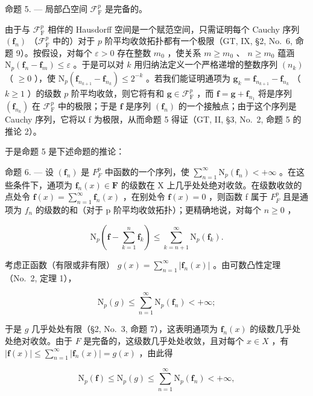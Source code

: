 命题 5. --- 局部凸空间 \(\mathcal{F}_{\mathrm{F}}^{p}\) 是完备的。

由于与 \(\mathcal{F}_{\mathrm{F}}^{p}\) 相伴的 Hausdorff 空间是一个赋范空间，只需证明每个 Cauchy 序列 \((\mathbf{f}_n)\) （\(\mathcal{F}_{\mathrm{F}}^{p}\) 中的）对于 \(p\) 阶平均收敛拓扑都有一个极限（GT, IX, §2, No.~6, 命题 9）。按假设，对每个 \(\varepsilon > 0\) 存在整数 \(m_0\) ，使关系 \(m \geqslant m_0\) 、 \(n \geqslant m_0\) 蕴涵 \(\mathrm{N}_p(\mathbf{f}_n - \mathbf{f}_m) \leqslant \varepsilon\) 。于是可以对 \(k\) 用归纳法定义一个严格递增的整数序列 \((n_k)\) （ \(\geqslant 0\) ），使 \(\mathrm{N}_p(\mathbf{f}_{n_{k+1}} - \mathbf{f}_{n_k}) \leqslant 2^{-k}\) 。若我们能证明通项为 \(\mathbf{g}_k = \mathbf{f}_{n_{k+1}} - \mathbf{f}_{n_k}\) （ \(k \geqslant 1\) ）的级数 \(p\) 阶平均收敛，则它将有和 \(\mathbf{g} \in \mathcal{F}_{\mathrm{F}}^p\) ，而 \(\mathbf{f} = \mathbf{g} + \mathbf{f}_{n_1}\) 将是序列 \((\mathbf{f}_{n_k})\) 在 \(\mathcal{F}_{\mathrm{F}}^p\) 中的极限；于是 \(\mathbf{f}\) 是序列 \((\mathbf{f}_n)\) 的一个接触点；由于这个序列是 Cauchy 序列，它将以 f 为极限，从而命题 5 得证（GT, II, §3, No.~2, 命题 5 的推论 2）。

于是命题 5 是下述命题的推论：

命题 6. --- 设 \((\mathbf{f}_{n})\) 是 \(F_{F}^{p}\) 中函数的一个序列，使 \(\sum_{n=1}^{\infty}\mathrm{N}_{p}(\mathbf{f}_{n})<+\infty\) 。在这些条件下，通项为 \(\mathbf{f}_{n}(x)\in\mathbf{F}\) 的级数在 X 上几乎处处绝对收敛。在级数收敛的点处令 \(\mathbf{f}(x)=\sum_{n=1}^{\infty}\mathbf{f}_{n}(x)\) ，在别处令 \(\mathbf{f}(x)=0\) ，则函数 f 属于 \(F_{F}^{p}\) 且是通项为 \(f_{n}\) 的级数的和（对于 p 阶平均收敛拓扑）；更精确地说，对每个 \(n\geqslant0\) ，

\[
\mathrm{N} _ {p} \left(\mathbf {f} - \sum_ {k = 1} ^ {n} \mathbf {f} _ {k}\right) \leqslant \sum_ {k = n + 1} ^ {\infty} \mathrm{N} _ {p} (\mathbf {f} _ {k}).\tag{8}
\]

考虑正函数（有限或非有限） \(g(x) = \sum_{n=1}^{\infty} |\mathbf{f}_n(x)|\) 。由可数凸性定理（No.~2, 定理 1），

\[
\mathrm{N} _ {p} (g) \leqslant \sum_ {n = 1} ^ {\infty} \mathrm{N} _ {p} (\mathbf {f} _ {n}) <   + \infty ;
\]

于是 \(g\) 几乎处处有限（§2, No.~3, 命题 7），这表明通项为 \(\mathbf{f}_n(x)\) 的级数几乎处处绝对收敛。由于 \(F\) 是完备的，这级数几乎处处收敛，且对每个 \(x \in X\) ，有 \(|\mathbf{f}(x)| \leqslant \sum_{n=1}^{\infty} |\mathbf{f}_n(x)| = g(x)\) ，由此得

\[
\mathrm{N} _ {p} (\mathbf {f}) \leqslant \mathrm{N} _ {p} (g) \leqslant \sum_ {n = 1} ^ {\infty} \mathrm{N} _ {p} (\mathbf {f} _ {n}) <   + \infty ,
\]

